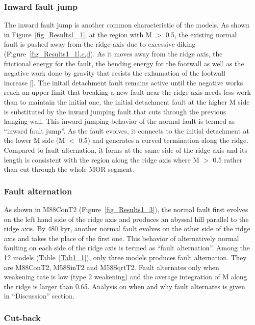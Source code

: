 \subsubsection{Inward fault jump}
The inward fault jump is another common characteristic of the models. As shown in Figure~\hyperref[fig_Results1_1]{\ref{fig_Results1_1}}, at the region with M $>$ 0.5, the existing normal fault is pushed away from the ridge-axis due to excessive diking (Figure~\hyperref[fig_Results1_1]{\ref{fig_Results1_1}.c,d}). As it moves away from the ridge axis, the frictional energy for the fault, the bending energy for the footwall as well as the negative work done by gravity that resists the exhumation of the footwall increase [\citealp{Lavier2000, Olive2014}]. The initail detachment fault remains active until the negative works reach an upper limit that breaking a new fault near the ridge axis needs less work than to maintain the initial one, the initial detachment fault at the higher M side is substituted by the inward jumping fault that cuts through the previous hanging wall. This inward jumping behavior of the normal fault is termed as ``inward fault jump''. As the fault evolves, it connects to the initial detachment at the lower M side (M $<$ 0.5) and generates a curved termination along the ridge. Compared to fault alternation, it forms at the same side of the ridge axis and its length is consistent with the region along the ridge axis where M $>$ 0.5 rather than cut through the whole MOR segment.
\subsubsection{Fault alternation}
As shown in M88ConT2 (Figure~\hyperref[fig_Results1_3]{\ref{fig_Results1_3}}), the normal fault first evolves on the left hand side of the ridge axis and produces an abyssal hill parallel to the ridge axis. By 480 kyr, another normal fault evolves on the other side of the ridge axis and takes the place of the first one. This behavior of alternatively normal faulting on each side of the ridge axis is termed as ``fault alternation''. Among the 12 models (Table~\hyperref[Tab1_1]{\ref{Tab1_1}}), only three models produces fault alternation. They are M88ConT2, M58SinT2 and M58SqrtT2. Fault alternates only when weakening rate is low (type 2 weakening) and the average integration of M along the ridge is larger than 0.65. Analysis on when and why fault alternates is given in ``Discussion'' section.

\subsubsection{Cut-back} 

